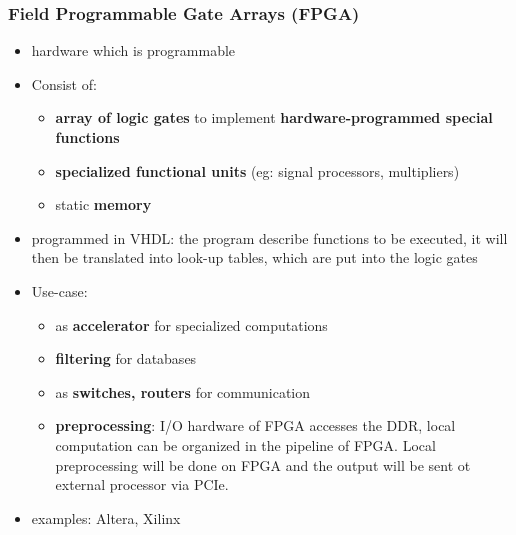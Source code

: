 \subsubsection{Field Programmable Gate Arrays (FPGA)}
\begin{itemize}
	\item hardware which is programmable
	\item Consist of:
	\begin{itemize}
		\item \textbf{array of logic gates} to implement \textbf{hardware-programmed special functions}
		\item \textbf{specialized functional units} (eg: signal processors, multipliers)
		\item static \textbf{memory}
	\end{itemize}
	\item programmed in VHDL: the program describe functions to be executed, it will then be translated into look-up tables, which are put into the logic gates
	\item Use-case:
	\begin{itemize}
		\item as \textbf{accelerator} for specialized computations
		\item \textbf{filtering} for databases
		\item as \textbf{switches, routers} for communication
		\item \textbf{preprocessing}: I/O hardware of FPGA accesses the DDR, local computation can be organized in the pipeline of FPGA. Local preprocessing will be done on FPGA and the output will be sent ot external processor via PCIe.
	\end{itemize}
	\item examples: Altera, Xilinx
\end{itemize}

